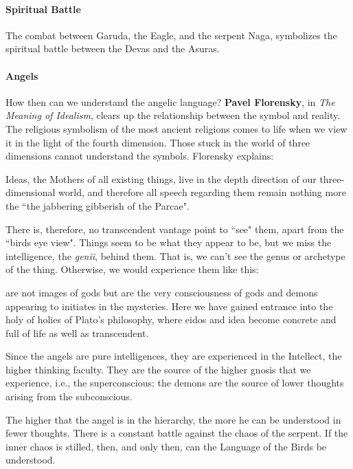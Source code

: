 \paragraph{Spiritual Battle}
The combat between Garuda, the Eagle, and the serpent Naga, symbolizes the spiritual battle between the Devas and the Asuras.

\paragraph{Angels}
How then can we understand the angelic language? \textbf{Pavel Florensky}, in \textit{The Meaning of Idealism}, clears up the relationship between the symbol and reality. The religious symbolism of the most ancient religions comes to life when we view it in the light of the fourth dimension. Those stuck in the world of three dimensions cannot understand the symbols. Florensky explains:

\begin{quotex}
Ideas, the Mothers of all existing things, live in the depth direction of our three-dimensional world, and therefore all speech regarding them remain nothing more the ``the jabbering gibberish of the Parcae".

\end{quotex}
There is, therefore, no transcendent vantage point to ``see" them, apart from the ``birds eye view". Things seem to be what they appear to be, but we miss the intelligence, the \emph{genii}, behind them. That is, we can't see the genus or archetype of the thing. Otherwise, we would experience them like this:

\begin{quotex}
 are not images of gods but are the very consciousness of gods and demons appearing to initiates in the mysteries. Here we have gained entrance into the holy of holies of Plato's philosophy, where eidos and idea become concrete and full of life as well as transcendent.

\end{quotex}
Since the angels are pure intelligences, they are experienced in the Intellect, the higher thinking faculty. They are the source of the higher gnosis that we experience, i.e., the superconscious; the demons are the source of lower thoughts arising from the subconscious.

The higher that the angel is in the hierarchy, the more he can be understood in fewer thoughts. There is a constant battle against the chaos of the serpent. If the inner chaos is stilled, then, and only then, can the Language of the Birds be understood.


